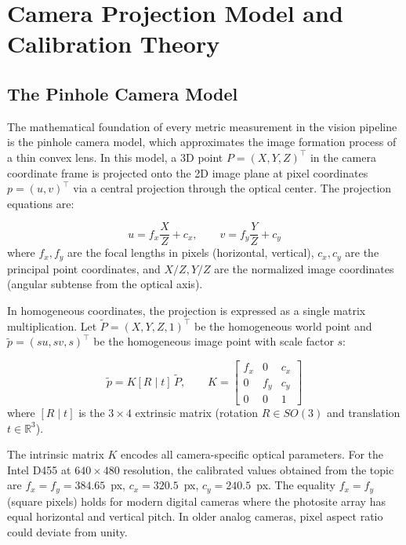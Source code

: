 \section{Camera Projection Model and Calibration Theory}

\subsection{The Pinhole Camera Model}

The mathematical foundation of every metric measurement in the vision pipeline is the pinhole camera model, which approximates the image formation process of a thin convex lens. In this model, a 3D point $P=(X,Y,Z)^\top$ in the camera coordinate frame is projected onto the 2D image plane at pixel coordinates $p=(u,v)^\top$ via a central projection through the optical center. The projection equations are:

\begin{eqblock}
\begin{equation}
u = f_x \frac{X}{Z} + c_x, \qquad v = f_y \frac{Y}{Z} + c_y
\end{equation}
where $f_x, f_y$ are the focal lengths in pixels (horizontal, vertical), $c_x, c_y$ are the principal point coordinates, and $X/Z, Y/Z$ are the normalized image coordinates (angular subtense from the optical axis).
\end{eqblock}

In homogeneous coordinates, the projection is expressed as a single matrix multiplication. Let $\tilde P = (X,Y,Z,1)^\top$ be the homogeneous world point and $\tilde p = (su, sv, s)^\top$ be the homogeneous image point with scale factor $s$:

\begin{eqblock}
\begin{equation}
\tilde p = K [R \mid t]\, \tilde P, \qquad
K = \begin{bmatrix} f_x & 0 & c_x \\ 0 & f_y & c_y \\ 0 & 0 & 1 \end{bmatrix}
\end{equation}
where $[R \mid t]$ is the $3\times4$ extrinsic matrix (rotation $R \in SO(3)$ and translation $t \in \mathbb{R}^3$).
\end{eqblock}

The intrinsic matrix $K$ encodes all camera-specific optical parameters. For the Intel D455 at $640\times480$ resolution, the calibrated values obtained from the  topic are $f_x=f_y=384.65$~px, $c_x=320.5$~px, $c_y=240.5$~px. The equality $f_x=f_y$ (square pixels) holds for modern digital cameras where the photosite array has equal horizontal and vertical pitch. In older analog cameras, pixel aspect ratio could deviate from unity.

